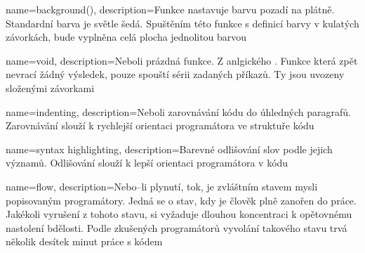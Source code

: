 {
  name={background()},
  description={Funkce nastavuje barvu pozadí na plátně. Standardní barva je světle šedá. Spuštěním této funkce s definicí barvy v kulatých závorkách, bude vyplněna celá plocha jednolitou barvou}
}


{
  name={void},
  description={Neboli prázdná funkce. Z anlgického . Funkce která zpět nevrací žádný výsledek, pouze spouští sérii zadaných příkazů. Ty jsou uvozeny složenými závorkami}
}

{
  name={indenting},
  description={Neboli zarovnávání kódu do úhledných paragrafů. Zarovnávání slouží k rychlejší orientaci programátora ve struktuře kódu}
}


{
  name={syntax highlighting},
  description={Barevné odlišování slov podle jejich významů. Odlišování slouží k lepší orientaci programátora v kódu}
}

{
  name={flow},
  description={Nebo--li plynutí, tok, je zvláštním stavem mysli popisovaným programátory. Jedná se o stav, kdy je člověk plně zanořen do práce. Jakékoli vyrušení z tohoto stavu, si vyžaduje dlouhou koncentraci k opětovnému nastolení bdělosti. Podle zkušených programátorů vyvolání takového stavu trvá několik desítek minut práce s kódem}
}

